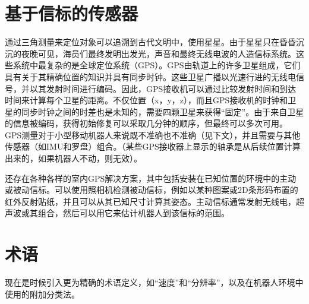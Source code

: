 

\section{基于信标的传感器}
通过三角测量来定位对象可以追溯到古代文明中，使用星星。由于星星只在昏昏沉沉的夜晚可见，海员们最终发明出发光，声音和最终无线电波的人造信标系统。这些系统中最复杂的是全球定位系统（GPS）。GPS由轨道上的许多卫星组成，它们具有关于其精确位置的知识并具有同步时钟。这些卫星广播以光速行进的无线电信号，并以其发射时间进行编码。因此，GPS接收机可以通过比较发射时间和到达时间来计算每个卫星的距离。不仅位置（x，y，z），而且GPS接收机的时钟和卫星的同步时钟之间的时差也是未知的，需要四颗卫星来获得“固定”。由于来自卫星的信息被编码，获得初始修复可以采取几分钟的顺序，但最终可以多次可用。GPS测量对于小型移动机器人来说既不准确也不准确（见下文），并且需要与其他传感器（如IMU和罗盘）组合。（某些GPS接收器上显示的轴承是从后续位置计算出来的，如果机器人不动，则无效）。

还存在各种各样的室内GPS解决方案，其中包括安装在已知位置的环境中的主动或被动信标。可以使用照相机检测被动信标，例如以某种图案或2D条形码布置的红外反射贴纸，并且可以从其已知尺寸计算其姿态。主动信标通常发射无线电，超声波或其组合，然后可以用它来估计机器人到该信标的范围。



\section{术语}
现在是时候引入更为精确的术语定义，如“速度”和“分辨率”，以及在机器人环境中使用的附加分类法。



